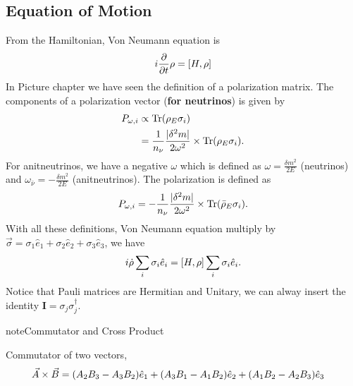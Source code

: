 \documentclass[letterpaper,12pt,english]{sphinxmanual}
\begin{document}
\subsection{Equation of Motion}
\label{oscillations:equation-of-motion}
From the Hamiltonian, Von Neumann equation is
\begin{gather}
\begin{split}i \frac{\partial}{\partial t}\rho = \left[ H , \rho\right]\end{split}\notag
\end{gather}
In Picture chapter we have seen the definition of a polarization matrix. The components of a polarization vector (\textbf{for neutrinos}) is given by
\begin{gather}
\begin{split}P_{\omega,i} &\propto \mathrm{Tr} (\rho_E \sigma_i) \\
& = \frac{1}{n_\nu} \frac{\lvert \delta^2 m \rvert}{2\omega^2} \times  \mathrm{Tr} (\rho_E \sigma_i) .\end{split}\notag
\end{gather}
For anitneutrinos, we have a negative \(\omega\) which is defined as \(\omega = \frac{ \delta m^2 }{2E}\) (neutrinos) and \(\omega_{\bar\nu}= - \frac{ \delta m^2 }{2E}\) (anitneutrinos). The polarization is defined as
\begin{gather}
\begin{split}P_{\omega,i} = - \frac{1}{n_\nu} \frac{\lvert \delta^2 m \rvert}{2\omega^2} \times  \mathrm{Tr} (\bar \rho_E \sigma_i) .\end{split}\notag
\end{gather}
With all these definitions, Von Neumann equation multiply by \(\vec{\sigma} = \sigma_1 \hat e_1 + \sigma_2 \hat e_2 + \sigma_3 \hat e_3\), we have
\begin{gather}
\begin{split}i \dot \rho \sum_i \sigma_i \hat e_i = \left[H, \rho\right] \sum_i\sigma_i \hat e_i.\end{split}\notag
\end{gather}
Notice that Pauli matrices are Hermitian and Unitary, we can alway insert the identity \(\mathbf I = \sigma_j \sigma_j^\dagger\).

\begin{notice}{note}{Commutator and Cross Product}

Commutator of two vectors,
\begin{gather}
\begin{split}\vec A \times \vec B & = (A_2 B_3 - A_3 B_2) \hat e_1 + (A_3 B_1 - A_1 B_2)\hat e_2 + (A_1 B_2 - A_2 B_3)\hat e_3\end{split}\notag
\end{gather}\end{notice}
\end{document}
